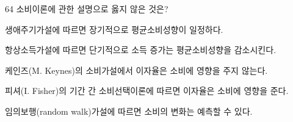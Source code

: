 \begin{question}{64}
소비이론에 관한 설명으로 옳지 않은 것은?
\begin{choices}
  \item 생애주기가설에 따르면 장기적으로 평균소비성향이 일정하다.
  \item 항상소득가설에 따르면 단기적으로 소득 증가는 평균소비성향을 감소시킨다.
  \item 케인즈(M. Keynes)의 소비가설에서 이자율은 소비에 영향을 주지 않는다.
  \item 피셔(I. Fisher)의 기간 간 소비선택이론에 따르면 이자율은 소비에 영향을 준다.
  \item 임의보행(random walk)가설에 따르면 소비의 변화는 예측할 수 있다.
\end{choices}
\end{question}
